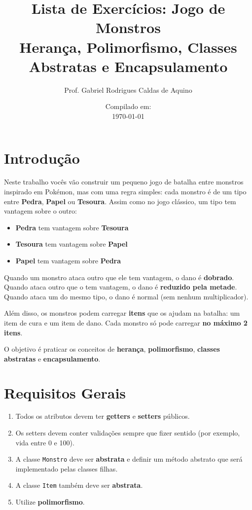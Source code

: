 \documentclass{article}
\title{Lista de Exercícios: Jogo de Monstros \\ Herança, Polimorfismo, Classes Abstratas e Encapsulamento}
\author{Prof. Gabriel Rodrigues Caldas de Aquino}
\date{Compilado em: \\ \today}
\begin{document}
\maketitle

\section{Introdução}

Neste trabalho vocês vão construir um pequeno jogo de batalha entre monstros inspirado em Pokémon,
mas com uma regra simples: cada monstro é de um tipo entre \textbf{Pedra}, \textbf{Papel} ou \textbf{Tesoura}.
Assim como no jogo clássico, um tipo tem vantagem sobre o outro:

\begin{itemize}
    \item \textbf{Pedra} tem vantagem sobre \textbf{Tesoura}
    \item \textbf{Tesoura} tem vantagem sobre \textbf{Papel}
    \item \textbf{Papel} tem vantagem sobre \textbf{Pedra}
\end{itemize}

Quando um monstro ataca outro que ele tem vantagem, o dano é \textbf{dobrado}.
Quando ataca outro que o tem vantagem, o dano é \textbf{reduzido pela metade}.
Quando ataca um do mesmo tipo, o dano é normal (sem nenhum multiplicador).

Além disso, os monstros podem carregar \textbf{itens} que os ajudam na batalha:
um item de cura e um item de dano. Cada monstro só pode carregar \textbf{no máximo 2 itens}.

O objetivo é praticar os conceitos de \textbf{herança}, \textbf{polimorfismo},
\textbf{classes abstratas} e \textbf{encapsulamento}.

\section{Requisitos Gerais}

\begin{enumerate}
    \item Todos os atributos devem ter \textbf{getters} e \textbf{setters} públicos.
    \item Os setters devem conter validações sempre que fizer sentido
          (por exemplo, vida entre 0 e 100).
    \item A classe \texttt{Monstro} deve ser \textbf{abstrata} e definir um método
          abstrato que será implementado pelas classes filhas.
    \item A classe \texttt{Item} também deve ser \textbf{abstrata}.
    \item Utilize \textbf{polimorfismo}.
\end{enumerate}
\end{document}
